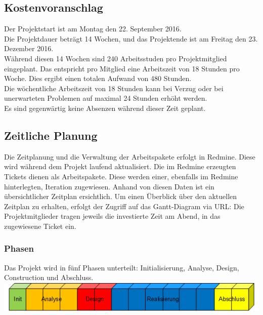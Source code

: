 \documentclass[a4,12pt]{scrartcl}
\begin{document}
\subsection{Kostenvoranschlag}
Der Projektstart ist am Montag den 22. September 2016. \\
Die Projektdauer beträgt 14 Wochen, und das Projektende ist am Freitag den 23. Dezember 2016. \\


\noindent Während diesen 14 Wochen sind 240 Arbeitsstuden pro Projektmitglied eingeplant. Das entspricht pro Mitglied eine Arbeitszeit von 18 Stunden pro Woche. Dies ergibt einen totalen Aufwand von 480 Stunden.\\

\noindent Die wöchentliche Arbeitszeit von 18 Stunden kann bei Verzug oder bei unerwarteten Problemen auf maximal 24 Stunden erhöht werden. \\

\noindent Es sind gegenwärtig keine Absenzen während dieser Zeit geplant. 
\subsection{Zeitliche Planung}
Die Zeitplanung und die Verwaltung der Arbeitspakete erfolgt in Redmine. Diese wird während dem Projekt laufend aktualisiert. Die im Redmine erzeugten Tickets dienen als Arbeitspakete. Diese werden einer, ebenfalls im Redmine hinterlegten, Iteration zugewiesen. Anhand von diesen Daten ist ein übersichtlicher Zeitplan ersichtlich. Um einen Überblick über den aktuellen Zeitplan zu erhalten, erfolgt der Zugriff auf das Gantt-Diagram via URL:
Die Projektmitglieder tragen jeweils die investierte Zeit am Abend, in das zugewiesene Ticket ein. 

\subsubsection{Phasen}
Das Projekt wird in fünf Phasen unterteilt: Initialisierung, Analyse, Design, Construction und Abschluss.
\newline
\newline
\includegraphics[width=1\textwidth]{figures/phasen.png}
\newpage
\end{document}
